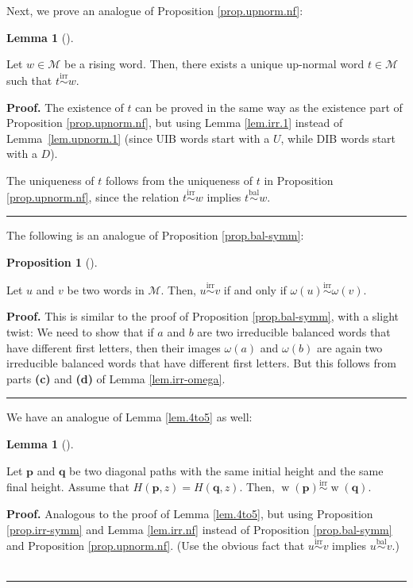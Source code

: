 \documentclass[numbers=enddot,12pt,final,onecolumn,notitlepage]{scrartcl}%
\theoremstyle{definition}
\newtheorem{lem}[theo]{Lemma}
\newenvironment{lemma}[1][]
{\begin{lem}[#1]\begin{leftbar}}
{\end{leftbar}\end{lem}}
\newtheorem{prop}[theo]{Proposition}
\newenvironment{proposition}[1][]
{\begin{prop}[#1]\begin{leftbar}}
{\end{leftbar}\end{prop}}
\newenvironment{proof}[1][Proof]{\noindent\textbf{#1.} }{\ \rule{0.5em}{0.5em}}
\newcommand{\M}{\mathcal{M}}
\newcommand{\pp}{\mathbf{p}}
\newcommand{\qq}{\mathbf{q}}
\newcommand{\w}{\operatorname{w}}
\newcommand{\balsim}{\overset{\operatorname*{bal}}{\sim}}
\newcommand{\irrsim}{\overset{\operatorname*{irr}}{\sim}}
\begin{document}
Next, we prove an analogue of Proposition \ref{prop.upnorm.nf}:

\begin{lemma}
\label{lem.irr.nf} Let $w\in\M$ be a rising word. Then, there exists
a unique up-normal word $t\in\M$ such that $t\irrsim w$.
\end{lemma}

\begin{proof}
The existence of $t$ can be proved in the same way as the existence
part of Proposition \ref{prop.upnorm.nf}, but using Lemma \ref{lem.irr.1}
instead of Lemma~\ref{lem.upnorm.1} (since UIB words start with a $U$, while
DIB words start with a $D$).

The uniqueness of $t$ follows from the uniqueness of $t$ in Proposition
\ref{prop.upnorm.nf}, since the relation $t\irrsim w$ implies $t\balsim w$.
\end{proof}

The following is an analogue of Proposition \ref{prop.bal-symm}:

\begin{proposition}
\label{prop.irr-symm} Let $u$ and $v$ be two words in $\M$. Then,
$u\irrsim v$ if and only if $\omega\left(  u\right)  \irrsim\omega\left(
v\right)  $.
\end{proposition}

\begin{proof}
This is similar to the proof of Proposition \ref{prop.bal-symm}, with a slight
twist: We need to show that if $a$ and $b$ are two irreducible balanced words
that have different first letters, then their images $\omega\left(  a\right)
$ and $\omega\left(  b\right)  $ are again two irreducible balanced words that
have different first letters. But this follows from parts \textbf{(c)} and
\textbf{(d)} of Lemma \ref{lem.irr-omega}.
\end{proof}

We have an analogue of Lemma \ref{lem.4to5} as well:

\begin{lemma}
\label{lem.irr.4to5} Let $\pp$ and $\qq$ be two diagonal paths
with the same initial height and the same final height. Assume that $H\left(
\pp,z\right)  =H\left(  \qq,z\right)  $. Then,
$\w\left(  \pp\right)  \irrsim\w\left(
\qq\right)  $.
\end{lemma}

\begin{proof}
Analogous to the proof of Lemma \ref{lem.4to5}, but using Proposition
\ref{prop.irr-symm} and Lemma \ref{lem.irr.nf} instead of Proposition
\ref{prop.bal-symm} and Proposition \ref{prop.upnorm.nf}. (Use the obvious
fact that $u\irrsim v$ implies $u\balsim v$.)
\end{proof}
\end{document}
